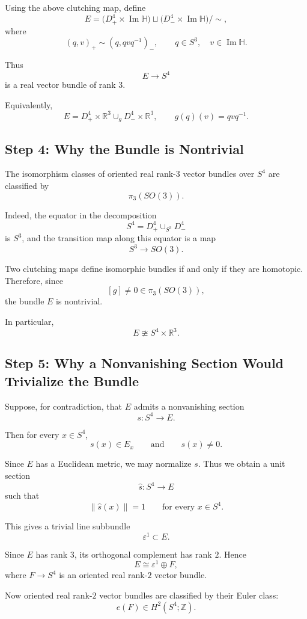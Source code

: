 \documentclass[12pt,a4paper]{article}
\theoremstyle{notespace}
\begin{document}
Using the above clutching map, define
\[
E =
\bigl(D^4_+ \times \operatorname{Im}\mathbb H\bigr)
\sqcup
\bigl(D^4_- \times \operatorname{Im}\mathbb H\bigr)
/\sim,
\]
where
\[
(q,v)_+ \sim (q,qvq^{-1})_-,
\qquad
q\in S^3,\quad v\in \operatorname{Im}\mathbb H.
\]

Thus
\[
E\longrightarrow S^4
\]
is a real vector bundle of rank \(3\).

Equivalently,
\[
\boxed{
	E =
	D^4_+ \times \mathbb R^3
	\cup_g
	D^4_- \times \mathbb R^3,
	\qquad
	g(q)(v)=qvq^{-1}.
}
\]

\subsection{Step 4: Why the Bundle is Nontrivial}

The isomorphism classes of oriented real rank-\(3\) vector bundles over \(S^4\) are classified by
\[
\pi_3(SO(3)).
\]

Indeed, the equator in the decomposition
\[
S^4=D^4_+\cup_{S^3}D^4_-
\]
is \(S^3\), and the transition map along this equator is a map
\[
S^3\to SO(3).
\]

Two clutching maps define isomorphic bundles if and only if they are homotopic. Therefore, since
\[
[g]\neq 0\in \pi_3(SO(3)),
\]
the bundle \(E\) is nontrivial.

In particular,
\[
E\ncong S^4\times \mathbb R^3.
\]

\subsection{Step 5: Why a Nonvanishing Section Would Trivialize the Bundle}

Suppose, for contradiction, that \(E\) admits a nonvanishing section
\[
s:S^4\longrightarrow E.
\]

Then for every \(x\in S^4\),
\[
s(x)\in E_x
\qquad
\text{and}
\qquad
s(x)\neq 0.
\]

Since \(E\) has a Euclidean metric, we may normalize \(s\). Thus we obtain a unit section
\[
\widehat{s}:S^4\longrightarrow E
\]
such that
\[
\|\widehat{s}(x)\|=1
\qquad
\text{for every }x\in S^4.
\]

This gives a trivial line subbundle
\[
\varepsilon^1 \subset E.
\]

Since \(E\) has rank \(3\), its orthogonal complement has rank \(2\). Hence
\[
E\cong \varepsilon^1\oplus F,
\]
where \(F\to S^4\) is an oriented real rank-\(2\) vector bundle.

Now oriented real rank-\(2\) vector bundles are classified by their Euler class:
\[
e(F)\in H^2(S^4;\mathbb Z).
\]
\end{document}
